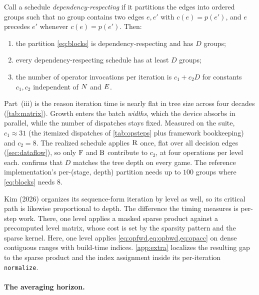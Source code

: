 \begin{proposition}
\label{prop:depth}
Call a schedule \emph{dependency-respecting} if it partitions the edges into ordered
groups such that no group contains two edges $e, e'$ with $c(e) = p(e')$, and $e$
precedes $e'$ whenever $c(e) = p(e')$. Then:
\begin{enumerate}[label=(\roman*),topsep=1pt,itemsep=0pt]
    \item the partition \cref{eq:blocks} is dependency-respecting and has $D$ groups;
    \item every dependency-respecting schedule has at least $D$ groups;
    \item the number of operator invocations per iteration is $c_1 + c_2 D$ for
    constants $c_1, c_2$ independent of $N$ and $E$.
\end{enumerate}
\end{proposition}

Part~(iii) is the reason iteration time is nearly flat in tree size across four
decades (\cref{tab:matrix}). Growth enters the batch \emph{widths}, which the device
absorbs in parallel, while the number of dispatches stays fixed. Measured on the
suite, $c_1 \approx 31$ (the itemized dispatches of \cref{tab:opsteps} plus framework
bookkeeping) and $c_2 = 8$. The realized schedule applies $\mathrm{R}$ once, flat over all
decision edges (\cref{sec:dataflow}), so only $\mathrm{F}$ and $\mathrm{B}$ contribute to $c_2$,
at four operations per level each.  confirms that $D$ matches the
tree depth on every game. The reference implementation's per-(stage, depth) partition
needs up to $100$ groups where \cref{eq:blocks} needs $8$.

Kim (2026) \cite{kim2026parallelizing} organizes its sequence-form iteration by
level as well, so its critical path is likewise proportional to depth. The
difference the timing measures is per-step work. There, one level applies a masked
sparse product against a precomputed level matrix, whose cost is set by the sparsity
pattern and the sparse kernel. Here, one level applies
\cref{eq:opfwd,eq:opbwd,eq:opacc} on dense contiguous ranges with build-time
indices. \cref{app:extra} localizes the resulting gap
to the sparse product and the index assignment inside its per-iteration
\texttt{normalize}.

\paragraph{The averaging horizon.}

